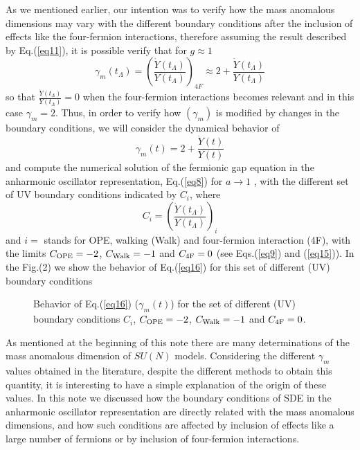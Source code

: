 \documentclass[preprint,amsmath,amssymb,superscriptaddress,showpacs,aps12pt]{revtex4}
\def\be{\begin{equation}}
\def\ee{\end{equation}}
\begin{document}
\par  As we mentioned earlier, our intention was to verify how the mass anomalous dimensions may vary with the different boundary conditions after the inclusion of effects like the four-fermion interactions, therefore assuming the result described by Eq.(\ref{eq11}), it is possible
verify that for $g \approx 1$  
\be 
\gamma_m(t_{\Lambda}) =  \left(\frac{\dot{Y}(t_{\Lambda})}{Y(t_{\Lambda})}\right)_{4F} \approx  2 + \frac{\dot{Y}(t_{\Lambda})}{Y(t_{\Lambda})}
\label{eq15}
\ee
\noindent so that $\frac{\dot{Y}(t_{\Lambda})}{Y(t_{\Lambda})}  =  0$ when  the four-fermion interactions becomes relevant and in this case 
$\gamma_m = 2$. Thus, in order to verify how $(\gamma_m)$ is modified by changes in the boundary conditions, we will consider the dynamical behavior of  
\be 
\gamma_m(t) = 2 + \frac{\dot{Y}(t)}{Y(t)}
\label{eq16}
\ee 
\noindent and compute the numerical solution of the fermionic  gap equation  in the  anharmonic oscillator representation, Eq.(\ref{eq8}) for $a \to 1$ , with the different set of UV boundary conditions indicated by $C_i$, where 
\be 
C_i = \left(\frac{\dot{Y}(t_{\Lambda})}{Y(t_{\Lambda})}\right)_i
\ee 
\noindent  and $i=$ stands for OPE, walking (Walk) and four-fermion interaction (4F), with the limits $C_{\rm{OPE}} = -2$, $C_{\rm{Walk}} = -1$ and $C_{\rm{4F}} = 0$ (see Eqs.(\ref{eq9}) and (\ref{eq15})). In the  Fig.(2) we show the behavior of  Eq.(\ref{eq16}) for this set of different (UV) boundary conditions 
\begin{figure}[!ht]
\begin{center}
\hspace*{2.3cm}
\vspace*{-4cm}
\caption{ Behavior of Eq.(\ref{eq16}) ($\gamma_m (t)$) for the set of different (UV) boundary conditions $C_i$, $C_{\rm{OPE}} = -2$, $C_{\rm{Walk}} = -1$ and $C_{\rm{4F}} = 0$.}
\end{center}
\end{figure}

\par As mentioned at the beginning of this note there are many determinations of the mass anomalous dimension of $SU(N)$ models. Considering
the different $\gamma_m$ values obtained in the literature, despite the different methods to obtain this quantity, it is interesting to have a simple explanation of the origin of these values. 
In this note we discussed  how the boundary conditions of SDE in the  anharmonic oscillator representation are directly related  with  the mass anomalous dimensions,  and how such conditions are  affected by inclusion of effects like a large number of fermions  or by inclusion of four-fermion interactions. 
\end{document}
